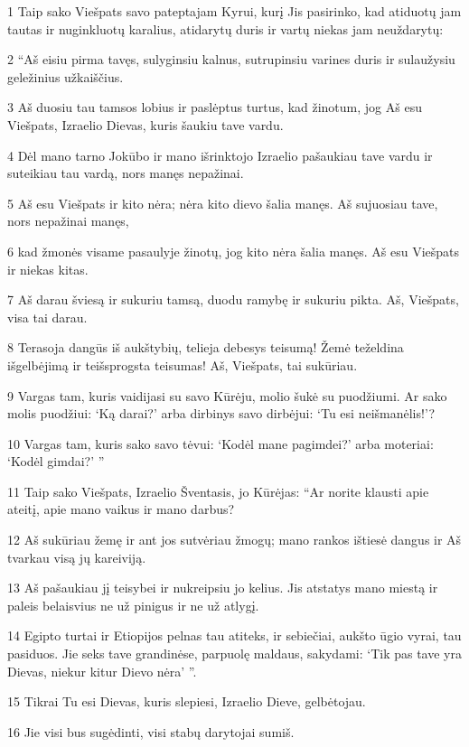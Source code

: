 \par 1 Taip sako Viešpats savo pateptajam Kyrui, kurį Jis pasirinko, kad atiduotų jam tautas ir nuginkluotų karalius, atidarytų duris ir vartų niekas jam neuždarytų: 
\par 2 “Aš eisiu pirma tavęs, sulyginsiu kalnus, sutrupinsiu varines duris ir sulaužysiu geležinius užkaiščius. 
\par 3 Aš duosiu tau tamsos lobius ir paslėptus turtus, kad žinotum, jog Aš esu Viešpats, Izraelio Dievas, kuris šaukiu tave vardu. 
\par 4 Dėl mano tarno Jokūbo ir mano išrinktojo Izraelio pašaukiau tave vardu ir suteikiau tau vardą, nors manęs nepažinai. 
\par 5 Aš esu Viešpats ir kito nėra; nėra kito dievo šalia manęs. Aš sujuosiau tave, nors nepažinai manęs, 
\par 6 kad žmonės visame pasaulyje žinotų, jog kito nėra šalia manęs. Aš esu Viešpats ir niekas kitas. 
\par 7 Aš darau šviesą ir sukuriu tamsą, duodu ramybę ir sukuriu pikta. Aš, Viešpats, visa tai darau. 
\par 8 Terasoja dangūs iš aukštybių, telieja debesys teisumą! Žemė teželdina išgelbėjimą ir teišsprogsta teisumas! Aš, Viešpats, tai sukūriau. 
\par 9 Vargas tam, kuris vaidijasi su savo Kūrėju, molio šukė su puodžiumi. Ar sako molis puodžiui: ‘Ką darai?’ arba dirbinys savo dirbėjui: ‘Tu esi neišmanėlis!’? 
\par 10 Vargas tam, kuris sako savo tėvui: ‘Kodėl mane pagimdei?’ arba moteriai: ‘Kodėl gimdai?’ ” 
\par 11 Taip sako Viešpats, Izraelio Šventasis, jo Kūrėjas: “Ar norite klausti apie ateitį, apie mano vaikus ir mano darbus? 
\par 12 Aš sukūriau žemę ir ant jos sutvėriau žmogų; mano rankos ištiesė dangus ir Aš tvarkau visą jų kareiviją. 
\par 13 Aš pašaukiau jį teisybei ir nukreipsiu jo kelius. Jis atstatys mano miestą ir paleis belaisvius ne už pinigus ir ne už atlygį. 
\par 14 Egipto turtai ir Etiopijos pelnas tau atiteks, ir sebiečiai, aukšto ūgio vyrai, tau pasiduos. Jie seks tave grandinėse, parpuolę maldaus, sakydami: ‘Tik pas tave yra Dievas, niekur kitur Dievo nėra’ ”. 
\par 15 Tikrai Tu esi Dievas, kuris slepiesi, Izraelio Dieve, gelbėtojau. 
\par 16 Jie visi bus sugėdinti, visi stabų darytojai sumiš. 
